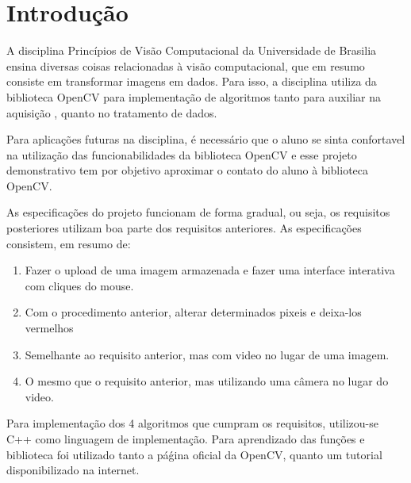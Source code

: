 \section{Introdução}
\label{sec:intro}

A disciplina Princípios de Visão Computacional da Universidade de Brasilia ensina diversas coisas relacionadas à visão computacional, que em resumo consiste em transformar imagens em dados. Para isso, a disciplina utiliza da biblioteca OpenCV\cite{OpenCVSite} para implementação de algoritmos tanto para auxiliar na aquisição , quanto no tratamento de dados.

Para aplicações futuras na disciplina, é necessário que o aluno se sinta confortavel na utilização das funcionabilidades da biblioteca OpenCV e esse projeto demonstrativo tem por objetivo aproximar o contato do aluno à biblioteca OpenCV.

As especificações do projeto funcionam de forma gradual, ou seja, os requisitos posteriores utilizam boa parte dos requisitos anteriores. As especificações consistem, em resumo de:

\begin{enumerate}
\item Fazer o upload de uma imagem armazenada e fazer uma interface interativa com cliques do mouse.
\item Com o procedimento anterior, alterar determinados pixeis e deixa-los vermelhos
\item Semelhante ao requisito anterior, mas com video no lugar de uma imagem.
\item O mesmo que o requisito anterior, mas utilizando uma câmera no lugar do video. 
\end{enumerate}

Para implementação dos 4 algoritmos que cumpram os requisitos, utilizou-se C++ como linguagem de implementação. Para aprendizado das funções e biblioteca foi utilizado tanto a páǵina oficial da OpenCV\cite{OpenCVSite}, quanto um tutorial disponibilizado na internet\cite{OpenCV-SFR}.
